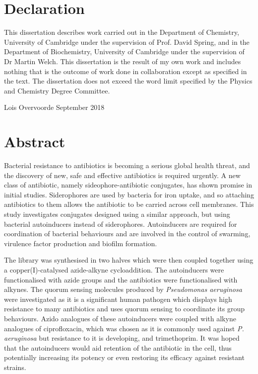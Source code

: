 \section{Declaration}

This dissertation describes work carried out in the Department of Chemistry, University of Cambridge under the supervision of Prof. David Spring, and in the Department of Biochemistry, University of Cambridge under the supervision of Dr Martin Welch. 
This dissertation is the result of my own work and includes nothing that is the outcome of work done in collaboration except as specified in the text. The dissertation does not exceed the word limit specified by the Physics and Chemistry Degree Committee.

\vspace{5cm}



Lois Overvoorde
September 2018
\newpage

\section{Abstract}

Bacterial resistance to antibiotics is becoming a serious global health threat, and the discovery of new, safe and effective antibiotics is required urgently\cite{ResistanceUS,davies2013drugs,ANIE:ANIE201209979}. A new class of antibiotic, namely sideophore-antibiotic conjugates, has shown promise in initial studies\cite{Page2013,Schalk2017}. Siderophores are used by bacteria for iron uptake, and so attaching antibiotics to them allows the antibiotic to be carried across cell membranes. This study investigates conjugates designed using a similar approach, but using bacterial autoinducers\cite{Waters2005} instead of siderophores. Autoinducers are required for coordination of bacterial behaviours and are involved in the control of swarming, virulence factor production and biofilm formation\cite{Miller2001}. 


The library was synthesised in two halves which were then coupled together using a copper(I)-catalysed azide-alkyne cycloaddition\cite{Tornoe2002,ANIE:ANIE2596}. The autoinducers were functionalised with azide groups and the antibiotics were functionalised with alkynes. The quorum sensing molecules produced by \textit{Pseudomonas aeruginosa} were investigated as it is a significant human pathogen\cite{Bodey1983} which displays high resistance to many antibiotics\cite{Poole2004} and uses quorum sensing to coordinate its group behaviours\cite{Dubern2008}. Azido analogues of these autoinducers were coupled with alkyne analogues of ciprofloxacin, which was chosen as it is commonly used against \textit{P. aeruginosa}\cite{Macgowan1999} but resistance to it is developing\cite{Su2010}, and trimethoprim. It was hoped that the autoinducers would aid retention of the antibiotic in the cell, thus potentially increasing its potency or even restoring its efficacy against resistant strains.

\newpage